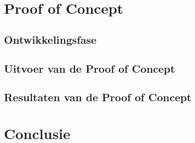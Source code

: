 \section*{Proof of Concept}
\label{sec:proof-of-concept}
\subsection*{Ontwikkelingsfase}
\subsection*{Uitvoer van de Proof of Concept}
\subsection*{Resultaten van de Proof of Concept}

\section*{Conclusie}

